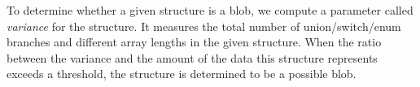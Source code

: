 To determine whether a given structure is a blob, 
we compute a parameter called {\em variance} for the structure. 
It measures the total number of union/switch/enum
branches and different array lengths in the given 
structure. When the ratio between the variance and the amount of the data
this structure represents exceeds a threshold, the structure is
determined to be a possible blob. 
